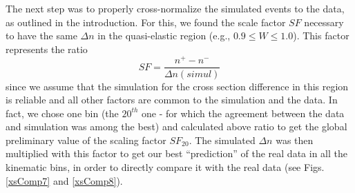 The next step was to properly cross-normalize the simulated events to the data, as outlined in the introduction. For this, we %
found the scale factor $SF$ necessary to have the same $\Delta n$ in the quasi-elastic region (e.g., $0.9 \le W \le 1.0$). This factor represents the ratio 
\begin{equation}
 SF = \frac{n^+ - n^-}{\Delta n(simul)} %
\end{equation}
since we assume that the simulation for the cross section difference in this region is reliable %
 and all other factors are common to the simulation and the data. In fact, we chose one \qsqs bin (the $20^{th}$ one - for which the agreement between the data and simulation was among the best) and calculated above ratio to get the global preliminary value of the scaling factor $SF_{20}$. The simulated $\Delta n$ was then multiplied with this factor to get our best ``prediction'' of the real data in all the kinematic bins, in order to directly compare it with the real data (see Figs. \ref{xsComp7} and \ref{xsComp8}). 





